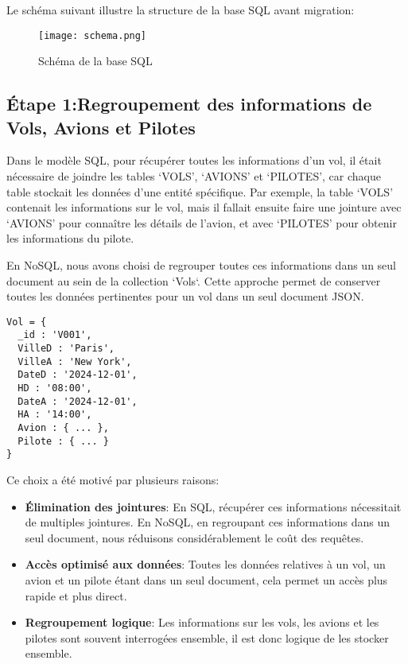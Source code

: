 Le schéma suivant illustre la structure de la base SQL avant migration: 

\begin{figure}[H]
  \centering
  \texttt{[image: schema.png]}
  \caption{Schéma de la base SQL}
\end{figure}

\subsection{Étape 1:Regroupement des informations de Vols, Avions et Pilotes}

Dans le modèle SQL, pour récupérer toutes les informations d'un vol, il était nécessaire de joindre les tables `VOLS', `AVIONS' et `PILOTES', car chaque table stockait les données d'une entité spécifique. Par exemple, la table `VOLS' contenait les informations sur le vol, mais il fallait ensuite faire une jointure avec `AVIONS' pour connaître les détails de l'avion, et avec `PILOTES' pour obtenir les informations du pilote.

En NoSQL, nous avons choisi de regrouper toutes ces informations dans un seul document au sein de la collection `Vols`. Cette approche permet de conserver toutes les données pertinentes pour un vol dans un seul document JSON.\@

\begin{verbatim}
Vol = {
  _id : 'V001',
  VilleD : 'Paris',
  VilleA : 'New York',
  DateD : '2024-12-01',
  HD : '08:00',
  DateA : '2024-12-01',
  HA : '14:00',
  Avion : { ... },
  Pilote : { ... }
}
\end{verbatim}

Ce choix a été motivé par plusieurs raisons:
\begin{itemize}
  \item \textbf{Élimination des jointures}: En SQL, récupérer ces informations nécessitait de multiples jointures. En NoSQL, en regroupant ces informations dans un seul document, nous réduisons considérablement le coût des requêtes.
  \item \textbf{Accès optimisé aux données}: Toutes les données relatives à un vol, un avion et un pilote étant dans un seul document, cela permet un accès plus rapide et plus direct.
  \item \textbf{Regroupement logique}: Les informations sur les vols, les avions et les pilotes sont souvent interrogées ensemble, il est donc logique de les stocker ensemble.
\end{itemize}

